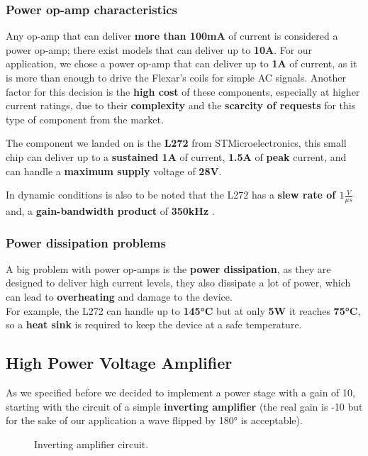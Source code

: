 \subsubsection{Power op-amp characteristics}
Any op-amp that can deliver \textbf{more than 100mA} of current is considered a power op-amp; there exist models that can deliver up to \textbf{10A}.
For our application, we chose a power op-amp that can deliver up to \textbf{1A} of current, as it is more than enough to drive the Flexar's coils for simple AC signals.
Another factor for this decision is the \textbf{high cost} of these components, especially at higher current ratings, due to their \textbf{complexity} and the \textbf{scarcity of requests} for this type of component from the market.

The component we landed on is the \textbf{L272} from STMicroelectronics, this small chip can deliver up to a \textbf{sustained 1A} of current, \textbf{1.5A} of \textbf{peak} current, and can handle a \textbf{maximum supply} voltage of \textbf{28V}.

In dynamic conditions is also to be noted that the L272 has a \textbf{slew rate of $1\frac{V}{\mu s}$} and, a \textbf{gain-bandwidth product} of \textbf{350kHz} \cite{L272}.

\subsubsection{Power dissipation problems}
A big problem with power op-amps is the \textbf{power dissipation}, as they are designed to deliver high current levels, they also dissipate a lot of power, which can lead to \textbf{overheating} and damage to the device. \\
For example, the L272 can handle up to \textbf{145°C} but at only \textbf{5W} it reaches \textbf{75°C}, so a \textbf{heat sink} is required to keep the device at a safe temperature.

\subsection{High Power Voltage Amplifier}
As we specified before we decided to implement a power stage with a gain of 10, starting with the circuit of a simple \textbf{inverting amplifier} (the real gain is -10 but for the sake of our application a wave flipped by 180° is acceptable).

\begin{figure}[H]
    \centering
    \resizebox{.6\linewidth}{!}{
        
    }
    \caption{Inverting amplifier circuit.}
    \label{fig:non-inv_ampl}
\end{figure}

